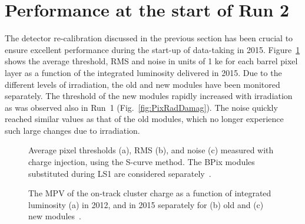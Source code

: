 
\section{Performance at the start of Run 2}\label{sec:BPixPerf2015}

The detector re-calibration discussed in the previous section has been crucial to ensure excellent performance during the start-up of data-taking in 2015.
Figure~\ref{fig:ThrVsLumi2015} shows the average threshold, RMS and noise in units of 1 ke for each barrel pixel layer as a function of the integrated luminosity delivered in 2015.
Due to the different levels of irradiation, the old and new modules have been monitored separately.
The threshold of the new modules rapidly increased with irradiation as was observed also in Run~1 (Fig.~\ref{fig:PixRadDamag}).
The noise quickly reached similar values as that of the old modules, which no longer experience such large changes due to irradiation.

\begin{figure}[!htb]
 \begin{center}
 \end{center}
 \caption{Average pixel thresholds (a), RMS (b), and noise (c) measured with charge injection, using the S-curve method. The BPix modules substituted during LS1 are considered separately~\cite{PixelOffline}.}
 \label{fig:ThrVsLumi2015}
\end{figure}

\begin{figure}[!htb]
 \begin{center}
 \end{center}
 \caption{The MPV of the on-track cluster charge as a function of integrated luminosity (a) in 2012, and in 2015 separately for (b) old and (c) new modules~\cite{PixelOffline}.}
 \label{fig:ClusterChargeVsLumi}
\end{figure}

